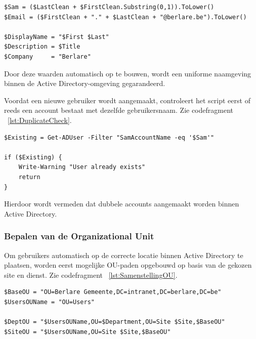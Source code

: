 \begin{listing}[ht]
\begin{verbatim}
$Sam = ($LastClean + $FirstClean.Substring(0,1)).ToLower()
$Email = ($FirstClean + "." + $LastClean + "@berlare.be").ToLower()

$DisplayName = "$First $Last"
$Description = $Title
$Company     = "Berlare"
\end{verbatim}
\caption{Variabelen toekennen}
\label{lst:VariabelenToekennen}
\end{listing}

Door deze waarden automatisch op te bouwen, wordt een uniforme naamgeving binnen de Active Directory-omgeving gegarandeerd.

Voordat een nieuwe gebruiker wordt aangemaakt, controleert het script eerst of reeds een account bestaat met dezelfde gebruikersnaam. Zie codefragment ~\ref{lst:DuplicateCheck}.

\begin{listing}[ht]
\begin{verbatim}
$Existing = Get-ADUser -Filter "SamAccountName -eq '$Sam'"

if ($Existing) {
    Write-Warning "User already exists"
    return
}
\end{verbatim}
\caption{Dubbele controle}
\label{lst:DuplicateCheck}
\end{listing}

Hierdoor wordt vermeden dat dubbele accounts aangemaakt worden binnen Active Directory.

\subsubsection{Bepalen van de Organizational Unit}

Om gebruikers automatisch op de correcte locatie binnen Active Directory te plaatsen, worden eerst mogelijke OU-paden opgebouwd op basis van de gekozen site en dienst. Zie codefragment ~\ref{lst:SamenstellingOU}.

\begin{listing}[ht]
\begin{verbatim}
$BaseOU = "OU=Berlare Gemeente,DC=intranet,DC=berlare,DC=be"
$UsersOUName = "OU=Users"

$DeptOU = "$UsersOUName,OU=$Department,OU=Site $Site,$BaseOU"
$SiteOU = "$UsersOUName,OU=Site $Site,$BaseOU"
\end{verbatim}
\caption{Samenstelling van de OU}
\label{lst:SamenstellingOU}
\end{listing}

